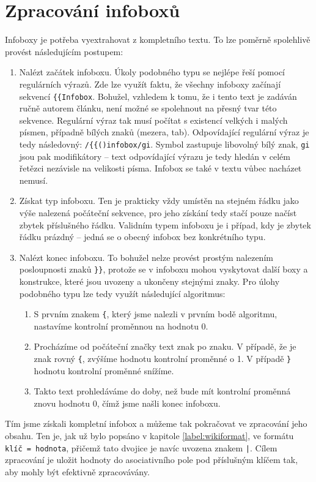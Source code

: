 \section{Zpracování infoboxů}
Infoboxy je potřeba vyextrahovat z kompletního textu. To lze poměrně spolehlivě provést následujícím postupem:
\begin{enumerate}
	\item Nalézt začátek infoboxu. Úkoly podobného typu se nejlépe řeší pomocí regulárních výrazů. Zde lze využít faktu, že všechny infoboxy začínají sekvencí \texttt{\{\{Infobox}. Bohužel, vzhledem k tomu, že i tento text je zadáván ručně autorem článku, není možné se spolehnout na přesný tvar této sekvence. Regulární výraz tak musí počítat s existencí velkých i malých písmen, případně bílých znaků (mezera, tab). Odpovídající regulární výraz je tedy následovný: \texttt{/\{\{(\string\s*)infobox/gi}. Symbol \texttt{\string\s} zastupuje libovolný bílý znak, \texttt{gi} jsou pak modifikátory -- text odpovídající výrazu je tedy hledán v celém řetězci nezávisle na velikosti písma. Infobox se také v textu vůbec nacházet nemusí.
	\item Získat typ infoboxu. Ten je prakticky vždy umístěn na stejném řádku jako výše nalezená počáteční sekvence, pro jeho získání tedy stačí pouze načíst zbytek příslušného řádku. Validním typem infoboxu je i případ, kdy je zbytek řádku prázdný -- jedná se o obecný infobox bez konkrétního typu.
	\item Nalézt konec infoboxu. To bohužel nelze provést prostým nalezením posloupnosti znaků \texttt{\}\}}, protože se v infoboxu mohou vyskytovat další boxy a konstrukce, které jsou uvozeny a ukončeny stejnými znaky. Pro úlohy podobného typu lze tedy využít následující algoritmus:
		\begin{enumerate}
			\item S prvním znakem \texttt{\{}, který jsme nalezli v prvním bodě algoritmu, nastavíme kontrolní proměnnou na hodnotu 0. 
			\item Procházíme od počáteční značky text znak po znaku. V případě, že je znak rovný \texttt{\{}, zvýšíme hodnotu kontrolní proměnné o 1. V případě \texttt{\}} hodnotu kontrolní proměnné snížíme.
			\item Takto text prohledáváme do doby, než bude mít kontrolní proměnná znovu hodnotu 0, čímž jsme našli konec infoboxu.
		\end{enumerate}
\end{enumerate}

Tím jsme získali kompletní infobox a můžeme tak pokračovat ve zpracování jeho obsahu. Ten je, jak už bylo popsáno v kapitole \ref{label:wikiformat}, ve formátu \texttt{klíč = hodnota}, přičemž tato dvojice je navíc uvozena znakem \texttt{|}. Cílem zpracování je uložit hodnoty do asociativního pole pod příslušným klíčem tak, aby mohly být efektivně zpracovávány.

